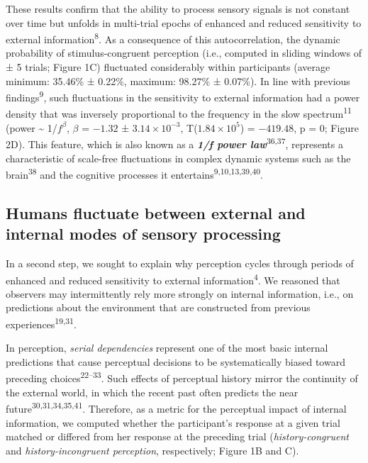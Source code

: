 \documentclass[
]{article}
\begin{document}
These results confirm that the ability to process sensory signals is not
constant over time but unfolds in multi-trial epochs of enhanced and
reduced sensitivity to external information\textsuperscript{8}. As a
consequence of this autocorrelation, the dynamic probability of
stimulus-congruent perception (i.e., computed in sliding windows of ± 5
trials; Figure 1C) fluctuated considerably within participants (average
minimum: 35.46\% ± 0.22\%, maximum: 98.27\% ± 0.07\%). In line with
previous findings\textsuperscript{9}, such fluctuations in the
sensitivity to external information had a power density that was
inversely proportional to the frequency in the slow
spectrum\textsuperscript{11} (power \textasciitilde{} 1/\(f^\beta\),
\(\beta\) = \(-1.32\) ± \(\ensuremath{3.14\times 10^{-3}}\),
T(\(\ensuremath{1.84\times 10^{5}}\)) = \(-419.48\), p = \(0\); Figure
2D). This feature, which is also known as a \textbf{\emph{1/f power
law}}\textsuperscript{36,37}, represents a characteristic of scale-free
fluctuations in complex dynamic systems such as the
brain\textsuperscript{38} and the cognitive processes it
entertains\textsuperscript{9,10,13,39,40}.

\hypertarget{humans-fluctuate-between-external-and-internal-modes-of-sensory-processing}{%
\subsection{Humans fluctuate between external and internal modes of
sensory
processing}\label{humans-fluctuate-between-external-and-internal-modes-of-sensory-processing}}

In a second step, we sought to explain why perception cycles through
periods of enhanced and reduced sensitivity to external
information\textsuperscript{4}. We reasoned that observers may
intermittently rely more strongly on internal information, i.e., on
predictions about the environment that are constructed from previous
experiences\textsuperscript{19,31}.

In perception, \emph{serial dependencies} represent one of the most
basic internal predictions that cause perceptual decisions to be
systematically biased toward preceding choices\textsuperscript{22--33}.
Such effects of perceptual history mirror the continuity of the external
world, in which the recent past often predicts the near
future\textsuperscript{30,31,34,35,41}. Therefore, as a metric for the
perceptual impact of internal information, we computed whether the
participant's response at a given trial matched or differed from her
response at the preceding trial (\emph{history-congruent} and
\emph{history-incongruent perception}, respectively; Figure 1B and C).
\end{document}
